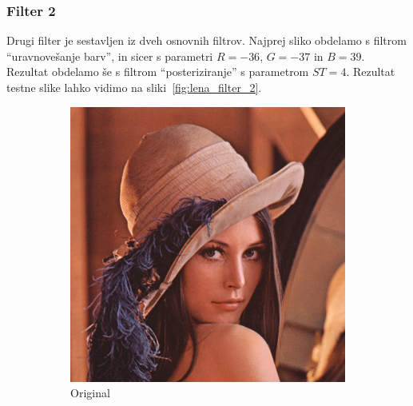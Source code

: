 \documentclass[a4paper, 12pt]{book}
\begin{document}
\subsubsection*{Filter 2}
Drugi filter je sestavljen iz dveh osnovnih filtrov. Najprej sliko obdelamo s
filtrom ``uravnovešanje barv'', in sicer s parametri $R = -36$, $G = -37$ in
$B = 39$. Rezultat obdelamo še s filtrom ``posteriziranje'' s parametrom
$ST = 4$. Rezultat testne slike lahko vidimo na sliki~\ref{fig:lena_filter_2}.

\begin{figure}[!ht]
    \centering
    \begin{subfigure}[b]{0.4\textwidth}
        \includegraphics[width=\textwidth]{lena}
        \caption{Original}
    \end{subfigure}
    \begin{subfigure}[b]{0.4\textwidth}

\end{subfigure}
\end{figure}
\end{document}
